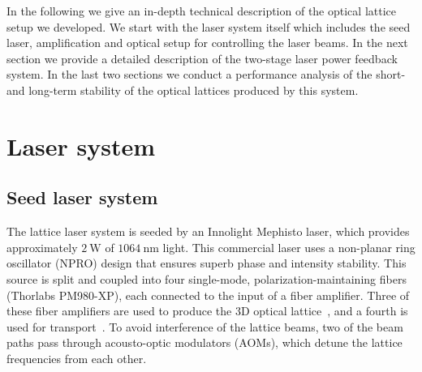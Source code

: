 \documentclass[twocolumn,aps,pra,showpacs,preprintnumbers,bibnotes]{revtex4-1}
\newcommand\unit[2]{\ensuremath{#1~\mathrm{{#2}}}}
\begin{document}
In the following we give an in-depth technical description of the optical lattice setup we developed. We start with the laser system itself which includes the seed laser, amplification and optical setup for controlling the laser beams. In the next section we provide a detailed description of the two-stage laser power feedback system. In the last two sections we conduct a performance analysis of the short- and long-term stability of the optical lattices produced by this system.

\section{Laser system}
\subsection{Seed laser system}
The lattice laser system is seeded by an Innolight Mephisto laser, which provides approximately \unit{2}{W} of \unit{1064}{nm} light.
This commercial laser uses a non-planar ring oscillator (NPRO) design that ensures superb phase and intensity stability.
This source is split and coupled into four single-mode, polarization-maintaining fibers (Thorlabs PM980-XP), each connected to the input of a fiber amplifier.
Three of these fiber amplifiers are used to produce the 3D optical lattice~\cite{Blatt2015,Parsons2016}, and a fourth is used for transport~\cite{Huber2014}.
To avoid interference of the lattice beams, two of the beam paths pass through acousto-optic modulators (AOMs), which detune the lattice frequencies from each other.
\end{document}

